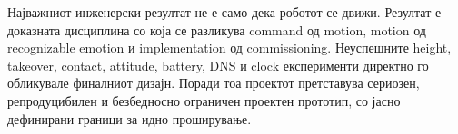 Најважниот инженерски резултат не е само дека роботот се движи. Резултат е
доказната дисциплина со која се разликува command од motion, motion од
recognizable emotion и implementation од commissioning. Неуспешните height,
takeover, contact, attitude, battery, DNS и clock експерименти директно го
обликувале финалниот дизајн. Поради тоа проектот претставува сериозен,
репродуцибилен и безбедносно ограничен проектен прототип, со јасно
дефинирани граници за идно проширување.
